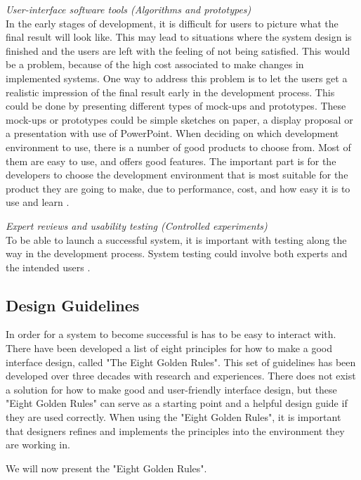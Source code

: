 \emph{User-interface software tools (Algorithms and prototypes)}\\
In the early stages of development, it is difficult for users to picture what the final result will look like. This may lead to situations where the system design is finished and the users are left with the feeling of not being satisfied. This would be a problem, because of the high cost associated to make changes in implemented systems. One way to address this problem is to let the users get a realistic impression of the final result early in the development process. This could be done by presenting different types of mock-ups and prototypes. These mock-ups or prototypes could be simple sketches on paper, a display proposal or a presentation with use of PowerPoint. When deciding on which development environment to use, there is a number of good products to choose from. Most of them are easy to use, and offers good features. The important part is for the developers to choose the development environment that is most suitable for the product they are going to make, due to performance, cost, and how easy it is to use and learn \cite{mmi}.
	
\emph{Expert reviews and usability testing (Controlled experiments)}\\
To be able to launch a successful system, it is important with testing along the way in the development process. System testing could involve both experts and the intended users \cite{mmi}. 

\subsection{Design Guidelines}
In order for a system to become successful is has to be easy to interact with. There have been developed a list of eight principles for how to make a good interface design, called "The Eight Golden Rules". This set of guidelines has been developed over three decades with research and experiences. There does not exist a solution for how to make good and user-friendly interface design, but these "Eight Golden Rules" can serve as a starting point and a helpful design guide if they are used correctly. When using the "Eight Golden Rules", it is important that designers refines and implements the principles into the environment they are working in. 

We will now present the "Eight Golden Rules".

